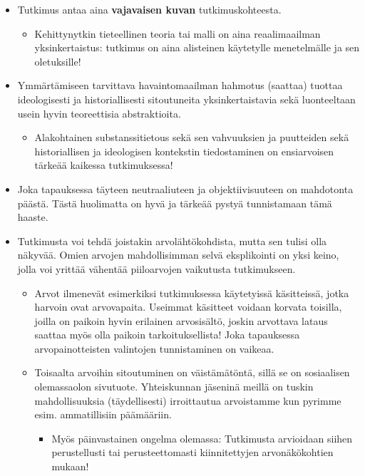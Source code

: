 \documentclass[
]{book}
\providecommand{\tightlist}{%
  \setlength{\itemsep}{0pt}\setlength{\parskip}{0pt}}
\begin{document}
\begin{itemize}
  \begin{itemize}
  \tightlist
  \item
    Tutkimus antaa aina \textbf{vajavaisen kuvan} tutkimuskohteesta.

    \begin{itemize}
    \tightlist
    \item
      Kehittynytkin tieteellinen teoria tai malli on aina reaalimaailman yksinkertaistus: tutkimus on aina alisteinen käytetylle menetelmälle ja sen oletuksille!
    \end{itemize}
  \item
    Ymmärtämiseen tarvittava havaintomaailman hahmotus (saattaa) tuottaa ideologisesti ja historiallisesti sitoutuneita yksinkertaistavia sekä luonteeltaan usein hyvin teoreettisia abstraktioita.

    \begin{itemize}
    \tightlist
    \item
      Alakohtainen substanssitietous sekä sen vahvuuksien ja puutteiden sekä historiallisen ja ideologisen kontekstin tiedostaminen on ensiarvoisen tärkeää kaikessa tutkimuksessa!
    \end{itemize}
  \item
    Joka tapauksessa täyteen neutraaliuteen ja objektiivisuuteen on mahdotonta päästä. Tästä huolimatta on hyvä ja tärkeää pystyä tunnistamaan tämä haaste.
  \item
    Tutkimusta voi tehdä joistakin arvolähtökohdista, mutta sen tulisi olla näkyvää. Omien arvojen mahdollisimman selvä eksplikointi on yksi keino, jolla voi yrittää vähentää piiloarvojen vaikutusta tutkimukseen.

    \begin{itemize}
    \tightlist
    \item
      Arvot ilmenevät esimerkiksi tutkimuksessa käytetyissä käsitteissä, jotka harvoin ovat arvovapaita. Useimmat käsitteet voidaan korvata toisilla, joilla on paikoin hyvin erilainen arvosisältö, joskin arvottava lataus saattaa myös olla paikoin tarkoituksellista! Joka tapauksessa arvopainotteisten valintojen tunnistaminen on vaikeaa.
    \item
      Toisaalta arvoihin sitoutuminen on väistämätöntä, sillä se on sosiaalisen olemassaolon sivutuote. Yhteiskunnan jäseninä meillä on tuskin mahdollisuuksia (täydellisesti) irroittautua arvoistamme kun pyrimme esim. ammatillisiin päämääriin.

      \begin{itemize}
      \tightlist
      \item
        Myös päinvastainen ongelma olemassa: Tutkimusta arvioidaan siihen perustellusti tai perusteettomasti kiinnitettyjen arvonäkökohtien mukaan!
      \end{itemize}
    \end{itemize}
  \end{itemize}
\end{itemize}
\end{document}
